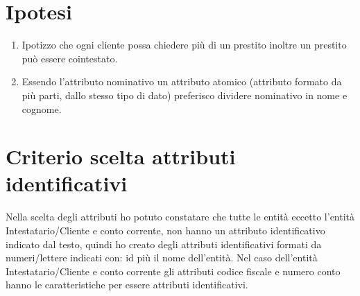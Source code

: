 \documentclass[12pt]{article}
\begin{document}
\renewcommand{\listtablename}{Liste Attributi}
\listoftables

\clearpage


\section{Ipotesi}
\begin{enumerate}
    \item Ipotizzo che ogni cliente possa chiedere più di un prestito inoltre un prestito può essere cointestato.
    
    \item Essendo l'attributo nominativo un attributo atomico (attributo formato da più parti, dallo stesso tipo di dato) preferisco dividere nominativo in nome e cognome.
\end{enumerate}


\section{Criterio scelta attributi identificativi}

\noindent
Nella scelta degli attributi ho potuto constatare che tutte le entità eccetto l'entità Intestatario/Cliente e conto corrente, non hanno un attributo identificativo indicato dal testo, quindi ho creato degli attributi identificativi formati da numeri/lettere indicati con: id più il nome dell'entità. Nel caso dell'entità Intestatario/Cliente e conto corrente gli attributi codice fiscale e numero conto hanno le caratteristiche per essere attributi identificativi.

\clearpage

\end{document}

